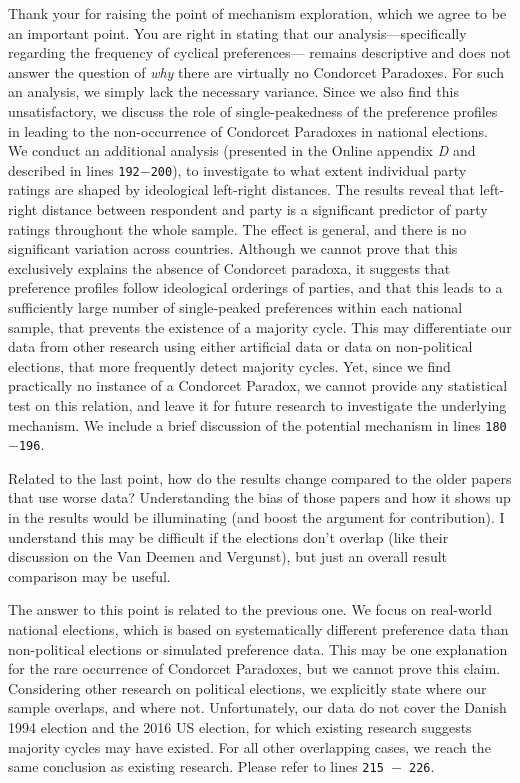 \documentclass[a4paper, 12pt]{scrartcl}
\theoremstyle{break}
\newenvironment{changes}{\par\color{violet}\par\addvspace{\baselineskip}}{\par\addvspace{\baselineskip}}
\begin{document}
Thank your for raising the point of mechanism exploration, which we agree to be an important point. You are right in stating that our analysis—specifically regarding the frequency of cyclical preferences— remains descriptive and does not answer the question of \textit{why} there are virtually no Condorcet Paradoxes. For such an analysis, we simply lack the necessary variance. Since we also find this unsatisfactory, we discuss the role of single-peakedness of the preference profiles in leading to the non-occurrence of Condorcet Paradoxes in national elections. We conduct an additional analysis (presented in the Online appendix \textit{D }and described in lines \texttt{192$-$200}), to investigate to what extent individual party ratings are shaped by ideological left-right distances. The results reveal that left-right distance between respondent and party is a significant predictor of party ratings throughout the whole sample. The effect is general, and there is no significant variation across countries. Although we cannot prove that this exclusively explains the absence of Condorcet paradoxa, it suggests that preference profiles follow ideological orderings of parties, and that this leads to a sufficiently large number of single-peaked preferences within each national sample, that prevents the existence of a majority cycle. This may differentiate our data from other research using either artificial data or data on non-political elections, that more frequently detect majority cycles. Yet, since we find practically no instance of a Condorcet Paradox, we cannot provide any statistical test on this relation, and leave it for future research to investigate the underlying mechanism. We include a brief discussion of the potential mechanism in lines \texttt{180$-$196}.

\begin{changes}
	Related to the last point, how do the results change compared to the older papers that use worse data? Understanding the bias of those papers and how it shows up in the results would be illuminating (and boost the argument for contribution). I understand this may be difficult if the elections don’t overlap (like their discussion on the Van	Deemen and Vergunst), but just an overall result comparison may be useful.
\end{changes}
The answer to this point is related to the previous one. We focus on real-world national elections, which is based on systematically different preference data than non-political elections or simulated preference data. This may be one explanation for the rare occurrence of Condorcet Paradoxes, but we cannot prove this claim. Considering other research on political elections, we explicitly state where our sample overlaps, and where not. Unfortunately, our data do not cover the Danish 1994 election and the 2016 US election, for which existing research suggests majority cycles may have existed. For all other overlapping cases, we reach the same conclusion as existing research. Please refer to lines \texttt{215 $-$ 226}.
\end{document}

